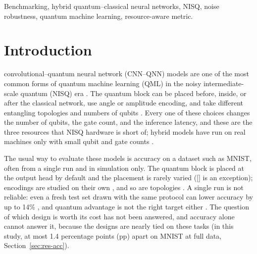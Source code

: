 \documentclass{ieeeaccess}
\begin{document}
\begin{keywords}
Benchmarking, hybrid quantum--classical neural networks, NISQ, noise robustness, quantum machine learning, resource-aware metric.
\end{keywords}

\titlepgskip=-21pt

\maketitle

\section{Introduction}
\label{sec:intro}

 convolutional--quantum neural network (CNN--QNN) models are one of the most common forms of quantum machine learning (QML) in the noisy intermediate-scale quantum (NISQ) era \cite{preskill2018nisq,cerezo2021vqa}. The quantum block can be placed before, inside, or after the classical network, use angle or amplitude encoding, and take different entangling topologies and numbers of qubits \cite{cong2019qcnn,henderson2020quanvolutional,liu2021hybrid}. Every one of these choices changes the number of qubits, the gate count, and the inference latency, and these are the three resources that NISQ hardware is short of; hybrid models have run on real machines only with small qubit and gate counts \cite{arthur2022qce}.

The usual way to evaluate these models is accuracy on a dataset such as MNIST, often from a single run and in simulation only. The quantum block is placed at the output head by default and the placement is rarely varied ([] is an exception); encodings are studied on their own \cite{mattern2021vqnn,fan2023hybrid}, and so are topologies \cite{sim2019expressibility,hubregtsen2021evaluation}. A single run is not reliable: even a fresh test set drawn with the same protocol can lower accuracy by up to 14\% \cite{bowles2024better}, and quantum advantage is not the right target either \cite{schuld2022advantage}. The question of which design is worth its cost has not been answered, and accuracy alone cannot answer it, because the designs are nearly tied on these tasks (in this study, at most 1.4 percentage points (pp) apart on MNIST at full data, Section~\ref{sec:res-acc}).
\end{document}
